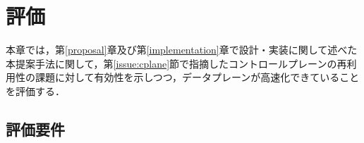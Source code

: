 \chapter{評価}
\label{evaluation}
本章では，第\ref{proposal}章及び第\ref{implementation}章で設計・実装に関して述べた本提案手法に関して，第\ref{issue:cplane}節で指摘したコントロールプレーンの再利用性の課題に対して有効性を示しつつ，データプレーンが高速化できていることを評価する．
\section{評価要件}







